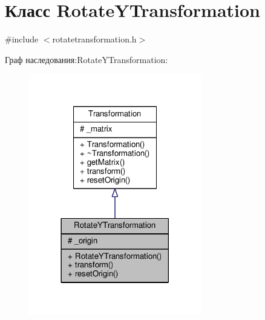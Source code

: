 \hypertarget{class_rotate_y_transformation}{}\section{Класс Rotate\+Y\+Transformation}
\label{class_rotate_y_transformation}


{\ttfamily \#include $<$rotatetransformation.\+h$>$}



Граф наследования\+:Rotate\+Y\+Transformation\+:
\nopagebreak
\begin{figure}[H]
\begin{center}
\leavevmode
\includegraphics[width=213pt]{d8/d5f/class_rotate_y_transformation__inherit__graph}
\end{center}
\end{figure}


